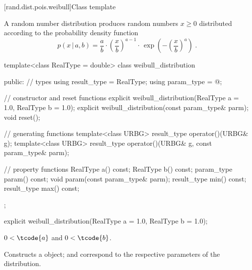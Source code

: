
[rand.dist.pois.weibull]{Class template }%
%
%

\pnum
A  random number distribution
produces random numbers $x \geq 0$
distributed according to
the probability density function%
%
%
\[%
 p(x\,|\,a,b)
      =       \frac{a}{b}
        \cdot \left(\frac{x}{b}\right)^{a-1}
        \cdot \, \exp\left( -\left(\frac{x}{b}\right)^a\right)
\; \mbox{.}
\]

%
\begin{codeblock}
template<class RealType = double>
 class weibull_distribution
{
public:
 // types
 using result_type = RealType;
 using param_type  = @\unspec@;

 // constructor and reset functions
 explicit weibull_distribution(RealType a = 1.0, RealType b = 1.0);
 explicit weibull_distribution(const param_type& parm);
 void reset();

 // generating functions
 template<class URBG>
   result_type operator()(URBG& g);
 template<class URBG>
   result_type operator()(URBG& g, const param_type& parm);

 // property functions
 RealType a() const;
 RealType b() const;
 param_type param() const;
 void param(const param_type& parm);
 result_type min() const;
 result_type max() const;
};
\end{codeblock}

%
\begin{itemdecl}
explicit weibull_distribution(RealType a = 1.0, RealType b = 1.0);
\end{itemdecl}%

\begin{itemdescr}
\pnum\requires
 $ 0 < \tcode{a} $ and  $ 0 < \tcode{b} $.

\pnum\effects Constructs a  object;
  and 
 correspond to the respective parameters of the distribution.
\end{itemdescr}

